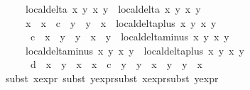 \begin{isabellebody}
\ \ \ \ {\isacharparenleft}local{\isachardot}delta\ x{}\ y{}\ x{}\ y{}\ {\isacharasterisk}\ local{\isachardot}delta\ x{}\ y{}\ x{}\ y{}{\isacharparenright}\ {\isacharequal}\ \isanewline
\ \ \ \ {\isacharparenleft}{\isacharparenleft}x{}\ {\isacharasterisk}\ x{}\ {\isacharminus}\ c\ {\isacharasterisk}\ y{}\ {\isacharasterisk}\ y{}{\isacharparenright}\ {\isacharasterisk}\ x{}\ {\isacharasterisk}\ local{\isachardot}delta{\isacharunderscore}plus\ x{}\ y{}\ x{}\ y{}\ {\isacharminus}\isanewline
\ \ \ \ \ c\ {\isacharasterisk}\ {\isacharparenleft}x{}\ {\isacharasterisk}\ y{}\ {\isacharplus}\ y{}\ {\isacharasterisk}\ x{}{\isacharparenright}\ {\isacharasterisk}\ y{}\ {\isacharasterisk}\ local{\isachardot}delta{\isacharunderscore}minus\ x{}\ y{}\ x{}\ y{}{\isacharparenright}\ {\isacharasterisk}\isanewline
\ \ \ \ {\isacharparenleft}local{\isachardot}delta{\isacharunderscore}minus\ x{}\ y{}\ x{}\ y{}\ {\isacharasterisk}\ local{\isachardot}delta{\isacharunderscore}plus\ x{}\ y{}\ x{}\ y{}\ {\isacharminus}\isanewline
\ \ \ \ \ d\ {\isacharasterisk}\ x{}\ {\isacharasterisk}\ y{}\ {\isacharasterisk}\ {\isacharparenleft}x{}\ {\isacharasterisk}\ x{}\ {\isacharminus}\ c\ {\isacharasterisk}\ y{}\ {\isacharasterisk}\ y{}{\isacharparenright}\ {\isacharasterisk}\ {\isacharparenleft}x{}\ {\isacharasterisk}\ y{}\ {\isacharplus}\ y{}\ {\isacharasterisk}\ x{}{\isacharparenright}{\isacharparenright}\isanewline
\ \ {\isachardoublequoteclose}\isanewline
\ \ \ \ \isamarkupfalse%
{\isacharparenleft}{\isacharparenleft}subst\ x{}{\isacharprime}{\isacharunderscore}expr{\isacharparenright}{\isacharplus}{\isacharcomma}\ {\isacharparenleft}subst\ y{}{\isacharprime}{\isacharunderscore}expr{\isacharparenright}{\isacharplus}{\isacharcomma}{\isacharparenleft}subst\ x{}{\isacharprime}{\isacharunderscore}expr{\isacharparenright}{\isacharplus}{\isacharcomma}{\isacharparenleft}subst\ y{}{\isacharprime}{\isacharunderscore}expr{\isacharparenright}{\isacharplus}{\isacharparenright}\isanewline
\ \ \ \ \isamarkupfalse%

\end{isabellebody}
